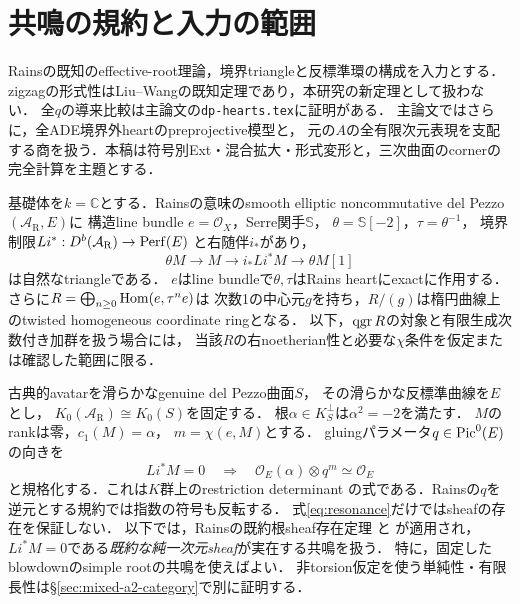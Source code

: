 \section{共鳴の規約と入力の範囲}
Rainsの既知のeffective-root理論，境界triangleと反標準環の構成を入力とする．
zigzagの形式性はLiu--Wangの既知定理であり，本研究の新定理として扱わない．
全$q$の導来比較は主論文\cite{Hearts}の\texttt{dp-hearts.tex}に証明がある．
主論文ではさらに，全ADE境界外heartのpreprojective模型と，
元の$A$の全有限次元表現を支配する商を扱う．本稿は符号別Ext・混合拡大・形式変形と，三次曲面のcornerの完全計算を主題とする．

基礎体を$k=\mathbb C$とする．Rainsの意味のsmooth elliptic
noncommutative del Pezzo $(\mathcal A_{\mathrm R},E)$に
構造line bundle $e=\mathcal O_X$，Serre関手$\mathbb S$，
$\theta=\mathbb S[-2]$，$\tau=\theta^{-1}$，
境界制限$Li^*:D^b(\mathcal A_{\mathrm R})\to\operatorname{Perf}(E)$
と右随伴$i_*$があり，
\begin{equation}\label{eq:boundarytriangle}
 \theta M\longrightarrow M\longrightarrow i_*Li^*M
 \longrightarrow\theta M[1]
\end{equation}
は自然なtriangleである\cite[\S\S4--5]{RainsFiltered}．
$e$はline bundleで$\theta,\tau$はRains heartにexactに作用する．
さらに$R=\bigoplus_{n\ge0}\operatorname{Hom}(e,\tau^ne)$は
次数1の中心元$g$を持ち，$R/(g)$は楕円曲線上のtwisted
homogeneous coordinate ringとなる\cite[Proposition 5.1]{RainsFiltered}．
以下，$\operatorname{qgr} R$の対象と有限生成次数付き加群を扱う場合には，
当該$R$の右noetherian性と必要な$\chi$条件を仮定または確認した範囲に限る．

古典的avatarを滑らかなgenuine del Pezzo曲面$S$，
その滑らかな反標準曲線を$E$とし，
$K_0(\mathcal A_{\mathrm R})\cong K_0(S)$を固定する．
根$\alpha\in K_S^\perp$は$\alpha^2=-2$を満たす．
$M$のrankは零，$c_1(M)=\alpha$，
$m=\chi(e,M)$とする．
gluingパラメータ$q\in\operatorname{Pic}^0(E)$の向きを
\begin{equation}\label{eq:resonance}
 Li^*M=0\quad\Longrightarrow\quad
 \mathcal O_E(\alpha)\otimes q^{m}\simeq\mathcal O_E
\end{equation}
と規格化する．これは$K$群上のrestriction determinant
の式である．Rainsの$q$を逆元とする規約では指数の符号も反転する．
式\eqref{eq:resonance}だけではsheafの存在を保証しない．
以下では，Rainsの既約根sheaf存在定理
\cite[\S9, \S11, pp.~139--141]{RainsBirational}と
\cite[\S4, pp.~33--35]{RainsFiltered}が適用され，
$Li^*M=0$である\emph{既約な純一次元sheaf}が実在する共鳴を扱う．
特に，固定したblowdownのsimple rootの共鳴を使えばよい．
非torsion仮定を使う単純性・有限長性は\S\ref{sec:mixed-a2-category}で別に証明する．

